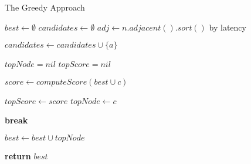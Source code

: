 \begin{algorithm}
  \caption{The Greedy Approach}\label{algo:greedy}
  \begin{algorithmic}[1]

    \State $best\gets \emptyset$
    \State $candidates\gets \emptyset$
    \State $adj\gets n.adjacent().sort()$ by latency

    \State $candidates\gets candidates \cup \{a\}$
    \EndIf
    
    \EndFor
    \EndFor

    \State $topNode = nil$
    \State $topScore = nil$
    
    \State $score\gets computeScore(best \cup c)$

    \State $topScore \gets score$
    \State $topNode \gets c$

    \EndIf

    \State \textbf{break}
    \EndIf

    
    \EndFor

    \State $best\gets best \cup topNode$
    
    \EndWhile
    \State \textbf{return} $best$
    \EndProcedure
  \end{algorithmic}
\end{algorithm}


